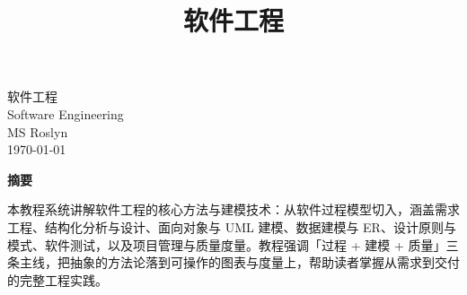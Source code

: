 \documentclass[12pt,a4paper]{ctexrep}
\title{\textbf{\huge 软件工程}}
\author{}
\date{}
\begin{document}
\clearpage
\thispagestyle{empty}
\vspace*{\fill}

\begin{center}
{\huge 软件工程}\\[0.8em]
{\large Software Engineering}\\[2.5em]
{\large MS Roslyn}\\[0.6em]
{\large \today}
\end{center}

\vspace{2.5em}

\begin{center}
{\bfseries 摘要}
\end{center}

\vspace{1em}

\begin{center}
本教程系统讲解软件工程的核心方法与建模技术：从软件过程模型切入，涵盖需求工程、结构化分析与设计、面向对象与 UML 建模、数据建模与 ER、设计原则与模式、软件测试，以及项目管理与质量度量。教程强调「过程 + 建模 + 质量」三条主线，把抽象的方法论落到可操作的图表与度量上，帮助读者掌握从需求到交付的完整工程实践。
\end{center}

\vspace*{\fill}
\clearpage

\tableofcontents
\newpage

\clearpage

\clearpage

\clearpage

\clearpage

\clearpage

\clearpage

\clearpage

\clearpage

\end{document}
